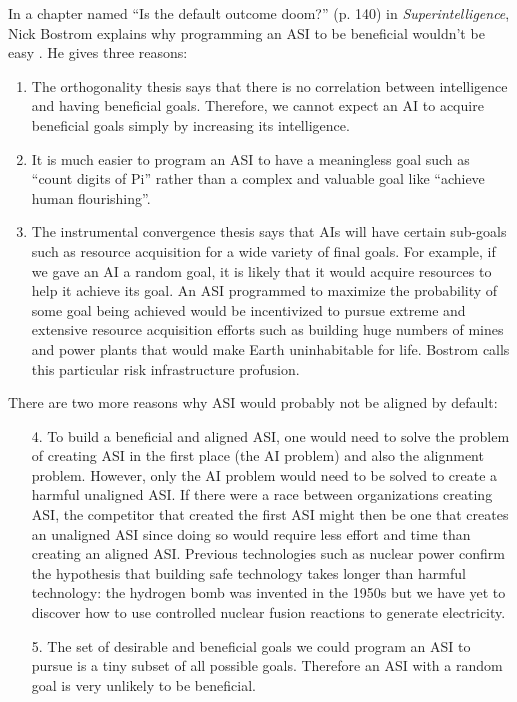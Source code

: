\documentclass{article}
\begin{document}
In a chapter named “Is the default outcome doom?” (p. 140) in \textit{Superintelligence}, Nick Bostrom explains why programming an ASI to be beneficial wouldn’t be easy \cite{superintelligence}. He gives three reasons:

\begin{enumerate}
    \item The orthogonality thesis says that there is no correlation between intelligence and having beneficial goals. Therefore, we cannot expect an AI to acquire beneficial goals simply by increasing its intelligence.
    
    \item It is much easier to program an ASI to have a meaningless goal such as “count digits of Pi” rather than a complex and valuable goal like “achieve human flourishing”.
    
    \item The instrumental convergence thesis says that AIs will have certain sub-goals such as resource acquisition for a wide variety of final goals. For example, if we gave an AI a random goal, it is likely that it would acquire resources to help it achieve its goal. An ASI programmed to maximize the probability of some goal being achieved would be incentivized to pursue extreme and extensive resource acquisition efforts such as building huge numbers of mines and power plants that would make Earth uninhabitable for life. Bostrom calls this particular risk infrastructure profusion.
\end{enumerate}

There are two more reasons why ASI would probably not be aligned by default:

\begin{enumerate}
    \item[4.] To build a beneficial and aligned ASI, one would need to solve the problem of creating ASI in the first place (the AI problem) and also the alignment problem. However, only the AI problem would need to be solved to create a harmful unaligned ASI. If there were a race between organizations creating ASI, the competitor that created the first ASI might then be one that creates an unaligned ASI since doing so would require less effort and time than creating an aligned ASI. Previous technologies such as nuclear power confirm the hypothesis that building safe technology takes longer than harmful technology: the hydrogen bomb was invented in the 1950s but we have yet to discover how to use controlled nuclear fusion reactions to generate electricity.
    
    \item[5.] The set of desirable and beneficial goals we could program an ASI to pursue is a tiny subset of all possible goals. Therefore an ASI with a random goal is very unlikely to be beneficial.
\end{enumerate}
\end{document}
